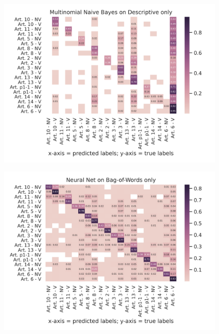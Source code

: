 \documentclass{article}
\begin{document}
\begin{figure}[!htb]
    \centering
    \includegraphics[scale=0.7]{data/analysis/cm/multiclass_cm_test_multinomial_naive_bayes_descriptive_only.png}  
\end{figure}
\begin{figure}[!htb]
    \centering
    \includegraphics[scale=0.7]{data/analysis/cm/multiclass_cm_test_neural_net_bag-of-words_only.png}  
\end{figure}
\end{document}
